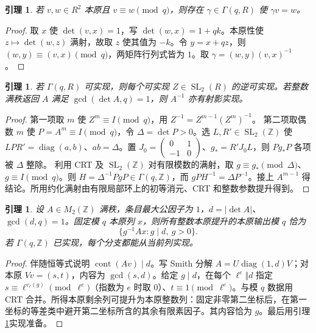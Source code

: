 \documentclass[11pt,a4paper]{article}
\newcommand{\Z}{\mathbb Z}
\newcommand{\SL}{\operatorname{SL}}
\newcommand{\diag}{\operatorname{diag}}
\newcommand{\cont}{\operatorname{cont}}
\newtheorem{lemma}[theorem]{引理}
\theoremstyle{definition}
\numberwithin{equation}{section}
\begin{document}
\begin{lemma}\label{lem:fiber}
若 $v,w\in R^2$ 本原且 $v\equiv w\pmod q$，则存在 $\gamma\in\Gamma(q,R)$ 使 $\gamma v=w$。
\end{lemma}
\begin{proof}
取 $x$ 使 $\det(v,x)=1$，写 $\det(w,x)=1+qk$。本原性使 $z\mapsto\det(w,z)$ 满射，故取 $z$ 使其值为 $-k$。令 $y=x+qz$，则 $(w,y)\equiv(v,x)\pmod q$，两矩阵行列式皆为 $1$。取 $\gamma=(w,y)(v,x)^{-1}$。
\end{proof}

\begin{lemma}\label{lem:inverse}
若 $\Gamma(q,R)$ 可实现，则每个可实现 $Z\in\SL_2(R)$ 的逆可实现。若整数满秩返回 $A$ 满足 $\gcd(\det A,q)=1$，则 $A^{-1}$ 亦有射影实现。
\end{lemma}
\begin{proof}
第一项取 $m$ 使 $Z^m\equiv I\pmod q$，用 $Z^{-1}=Z^{m-1}(Z^m)^{-1}$。
第二项取偶数 $m$ 使 $P=A^m\equiv I\pmod q$，令 $\Delta=\det P>0$。选 $L,R'\in\SL_2(\Z)$ 使 $LPR'=\diag(a,b)$、$ab=\Delta$。置 $J_0=\left(\begin{smallmatrix}0&1\\-1&0\end{smallmatrix}\right)$、$g_*=R'J_0L$，则 $Pg_*P$ 各项被 $\Delta$ 整除。
利用 CRT 及 $\SL_2(\Z)$ 对有限模数的满射，取 $g\equiv g_*\pmod\Delta$、$g\equiv I\pmod q$。则 $H=\Delta^{-1}PgP\in\Gamma(q,\Z)$，而 $gPH^{-1}=\Delta P^{-1}$。接上 $A^{m-1}$ 得结论。所用约化满射由有限局部环上的初等消元、CRT 和整数参数提升得到。
\end{proof}

\begin{lemma}\label{lem:content}
设 $A\in M_2(\Z)$ 满秩，条目最大公因子为 $1$，$d=|\det A|$、$\gcd(d,q)=1$。固定模 $q$ 本原列 $x$，则所有整数本原提升的本原输出模 $q$ 恰为
\begin{equation}
\{g^{-1}Ax:g\mid d,\ g>0\}.
\end{equation}
若 $\Gamma(q,\Z)$ 已实现，每个分支都能从当前列实现。
\end{lemma}
\begin{proof}
伴随恒等式说明 $\cont(Av)\mid d$。写 Smith 分解 $A=U\diag(1,d)V$；对本原 $Vv=(s,t)$，内容为 $\gcd(s,d)$。给定 $g\mid d$，在每个 $\ell^e\Vert d$ 指定 $s\equiv\ell^{v_\ell(g)}\pmod{\ell^e}$（指数为 $e$ 时取 $0$）、$t\equiv1\pmod{\ell^e}$。与模 $q$ 数据用 CRT 合并。所得本原剩余列可提升为本原整数列：固定非零第二坐标后，在第一坐标的等差类中避开第二坐标所含的其余有限素因子。其内容恰为 $g$。最后用引理\ref{lem:fiber}实现准备。
\end{proof}
\end{document}
